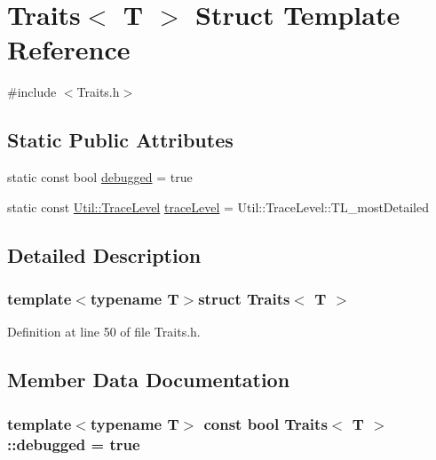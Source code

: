\hypertarget{struct_traits}{\section{Traits$<$ T $>$ Struct Template Reference}
\label{struct_traits}
}


{\ttfamily \#include $<$Traits.\-h$>$}

\subsection*{Static Public Attributes}
\begin{DoxyCompactItemize}
\item 
static const bool \hyperlink{struct_traits_a0abb19a116800ab778598eed38bad4a0}{debugged} = true
\item 
static const \hyperlink{class_util_a604561d00f5999b5ca280401140e58d9}{Util\-::\-Trace\-Level} \hyperlink{struct_traits_a032499d15672915dd3349e6cc0e9c673}{trace\-Level} = Util\-::\-Trace\-Level\-::\-T\-L\-\_\-most\-Detailed
\end{DoxyCompactItemize}


\subsection{Detailed Description}
\subsubsection*{template$<$typename T$>$struct Traits$<$ T $>$}



Definition at line 50 of file Traits.\-h.



\subsection{Member Data Documentation}
\hypertarget{struct_traits_a0abb19a116800ab778598eed38bad4a0}{
\subsubsection[{debugged}]{\setlength{\rightskip}{0pt plus 5cm}template$<$typename T$>$ const bool {\bf Traits}$<$ T $>$\-::debugged = true\hspace{0.3cm}{\ttfamily [static]}}}\label{struct_traits_a0abb19a116800ab778598eed38bad4a0}


